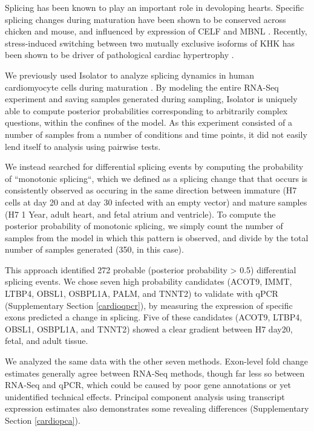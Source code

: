 \documentclass[twocolumn]{article}
\begin{document}
Splicing has been known to play an important role in devoloping hearts. Specific
splicing changes during maturation have been shown to be conserved across
chicken and mouse, and influenced by expression of CELF and MBNL
\cite{Kalsotra:2008ke}. Recently, stress-induced switching between two mutually
exclusive isoforms of KHK has been shown to be driver of pathological cardiac
hypertrophy \cite{Mirtschink:2015iq}.

We previously used Isolator to analyze splicing dynamics in human cardiomyocyte
cells during maturation \cite{Kuppusamy:2015ey}. By modeling the entire RNA-Seq
experiment and saving samples generated during sampling, Isolator is uniquely
able to compute posterior probabilities corresponding to arbitrarily complex
questions, within the confines of the model. As this experiment consisted of
a number of samples from a number of conditions and time points, it did not
easily lend itself to analysis using pairwise tests.

We instead searched for differential splicing events by computing the
probability of ``monotonic splicing``, which we defined as a splicing change
that that occurs is consistently observed as occuring in the same direction
between immature (H7 cells at day 20 and at day 30 infected with an empty
vector) and mature samples (H7 1 Year, adult heart, and fetal atrium and
ventricle). To compute the posterior probability of monotonic splicing, we
simply count the number of samples from the model in which this pattern is
observed, and divide by the total number of samples generated (350, in this
case).

This approach identified 272 probable (posterior probability > 0.5) differential
splicing events. We chose seven high probability candidates (ACOT9, IMMT, LTBP4,
OBSL1, OSBPL1A, PALM, and TNNT2) to validate with qPCR (Supplementary Section
\ref{cardioqpcr}), by measuring the expression of specific exons predicted a
change in splicing. Five of these candidates (ACOT9, LTBP4, OBSL1, OSBPL1A, and
TNNT2) showed a clear gradient between H7 day20, fetal, and adult tissue.

We analyzed the same data with the other seven methods. Exon-level fold change
estimates generally agree between RNA-Seq methods, though far less so between
RNA-Seq and qPCR, which could be caused by poor gene annotations or yet
unidentified technical effects. Principal component analysis using transcript
expression estimates also demonstrates some revealing differences (Supplementary
Section \ref{cardiopca}).
\end{document}
